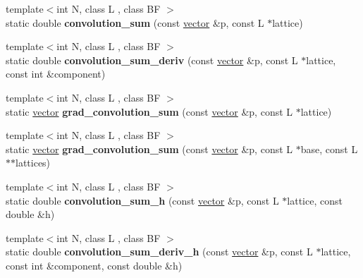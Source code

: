 \begin{DoxyCompactItemize}
{\footnotesize template$<$int N, class L , class BF $>$ }\\static double {\bfseries convolution\+\_\+sum} (const \hyperlink{namespacesisl_a2069bd5374a9be042ff3ce3306d41e1a}{vector} \&p, const L $\ast$lattice)
\item 
\mbox{\label{classsisl_1_1tp__cubic_a344fe815e50a1f2a4658d38012f242a1}} 
{\footnotesize template$<$int N, class L , class BF $>$ }\\static double {\bfseries convolution\+\_\+sum\+\_\+deriv} (const \hyperlink{namespacesisl_a2069bd5374a9be042ff3ce3306d41e1a}{vector} \&p, const L $\ast$lattice, const int \&component)
\item 
\mbox{\label{classsisl_1_1tp__cubic_ae719ea071f586f2c07f1521ec19a207e}} 
{\footnotesize template$<$int N, class L , class BF $>$ }\\static \hyperlink{namespacesisl_a2069bd5374a9be042ff3ce3306d41e1a}{vector} {\bfseries grad\+\_\+convolution\+\_\+sum} (const \hyperlink{namespacesisl_a2069bd5374a9be042ff3ce3306d41e1a}{vector} \&p, const L $\ast$lattice)
\item 
\mbox{\label{classsisl_1_1tp__cubic_a7b08f1c6554647acd0a703ff1a8c8a68}} 
{\footnotesize template$<$int N, class L , class BF $>$ }\\static \hyperlink{namespacesisl_a2069bd5374a9be042ff3ce3306d41e1a}{vector} {\bfseries grad\+\_\+convolution\+\_\+sum} (const \hyperlink{namespacesisl_a2069bd5374a9be042ff3ce3306d41e1a}{vector} \&p, const L $\ast$base, const L $\ast$$\ast$lattices)
\item 
\mbox{\label{classsisl_1_1tp__cubic_ad51d09327c593bb6a1198e045c779642}} 
{\footnotesize template$<$int N, class L , class BF $>$ }\\static double {\bfseries convolution\+\_\+sum\+\_\+h} (const \hyperlink{namespacesisl_a2069bd5374a9be042ff3ce3306d41e1a}{vector} \&p, const L $\ast$lattice, const double \&h)
\item 
\mbox{\label{classsisl_1_1tp__cubic_a6ebf576744106ee08e04f4ca2abed35b}} 
{\footnotesize template$<$int N, class L , class BF $>$ }\\static double {\bfseries convolution\+\_\+sum\+\_\+deriv\+\_\+h} (const \hyperlink{namespacesisl_a2069bd5374a9be042ff3ce3306d41e1a}{vector} \&p, const L $\ast$lattice, const int \&component, const double \&h)
$$
\end{DoxyCompactItemize}
